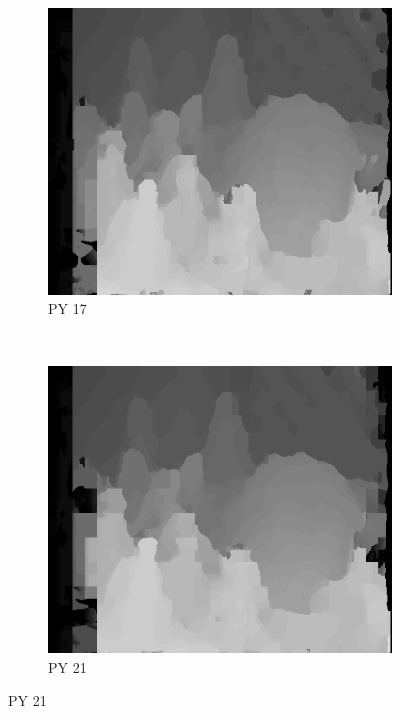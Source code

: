 \begin{figure}
\begin{subfigure}[b]{0.23\textwidth}
    \centering
    \includegraphics[width=\textwidth]{images/stereo-pairs/cones_pyramid_17.png}
    \caption{PY 17}
  \end{subfigure}
  ~
  \begin{subfigure}[b]{0.23\textwidth}
    \centering
    \includegraphics[width=\textwidth]{images/stereo-pairs/cones_pyramid_21.png}
    \caption{PY 21}
  \end{subfigure}


\end{figure}
